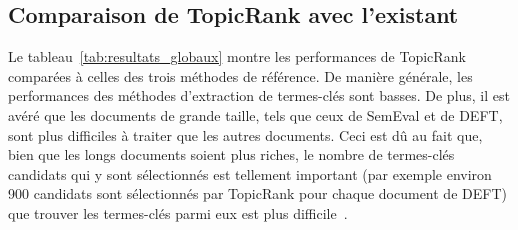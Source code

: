       \subsection{Comparaison de TopicRank avec l'existant}
      \label{subsec:main-automatic_keyphrase_annotation-unsupervised_automatic_keyphrase_extraction-evaluation-comparison_with_state_of_the_art}
        Le tableau~\ref{tab:resultats_globaux} montre les performances de
        TopicRank comparées à celles des trois méthodes de référence. De manière
        générale, les performances des méthodes d'extraction de termes-clés sont
        basses. De plus, il est avéré que les documents de grande taille, tels
        que ceux de SemEval et de DEFT, sont plus difficiles à traiter que les
        autres documents. Ceci est dû au fait que, bien que les longs documents
        soient plus riches, le nombre de termes-clés candidats qui y sont
        sélectionnés est tellement important (par exemple environ 900 candidats
        sont sélectionnés par TopicRank pour chaque document de DEFT) que
        trouver les termes-clés parmi eux est plus
        difficile~\cite{hasan2014state_of_the_art}.

